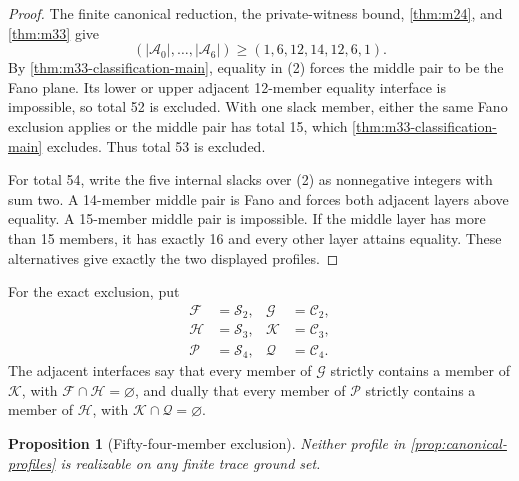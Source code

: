 \documentclass[a4paper,fleqn,longmktitle]{cas-sc}
\newtheorem{proposition}[theorem]{Proposition}
\theoremstyle{definition}
\theoremstyle{remark}
\begin{document}
\begin{proof}
The finite canonical reduction, the private-witness bound,
\cref{thm:m24}, and \cref{thm:m33} give
\[
  (|\mathcal A_0|,\ldots,|\mathcal A_6|)
  \geq(1,6,12,14,12,6,1).
  \tag{2}
\]
By \cref{thm:m33-classification-main}, equality in (2) forces the middle pair
to be the Fano plane.  Its lower or upper adjacent 12-member equality
interface is impossible, so total 52 is excluded.  With one slack member,
either the same Fano exclusion applies or
the middle pair has total 15, which
\cref{thm:m33-classification-main} excludes.  Thus total 53 is excluded.

For total 54, write the five internal slacks over (2) as nonnegative integers
with sum two.  A 14-member middle pair is Fano and forces both adjacent layers
above equality.  A 15-member middle pair is impossible.  If the middle layer
has more than 15 members, it has exactly 16 and every other layer attains
equality.  These alternatives give exactly the two displayed profiles.
\end{proof}

For the exact exclusion, put
\[
\begin{aligned}
  \mathcal F&=\mathcal S_2,&\mathcal G&=\mathcal C_2,\\
  \mathcal H&=\mathcal S_3,&\mathcal K&=\mathcal C_3,\\
  \mathcal P&=\mathcal S_4,&\mathcal Q&=\mathcal C_4.
\end{aligned}
\]
The adjacent interfaces say that every member of $\mathcal G$ strictly
contains a member of $\mathcal K$, with
$\mathcal F\cap\mathcal H=\varnothing$, and dually that every member of
$\mathcal P$ strictly contains a member of $\mathcal H$, with
$\mathcal K\cap\mathcal Q=\varnothing$.

\begin{proposition}[Fifty-four-member exclusion]
\label{prop:exclude54}
Neither profile in \cref{prop:canonical-profiles} is realizable on any finite
trace ground set.
\end{proposition}
\end{document}
